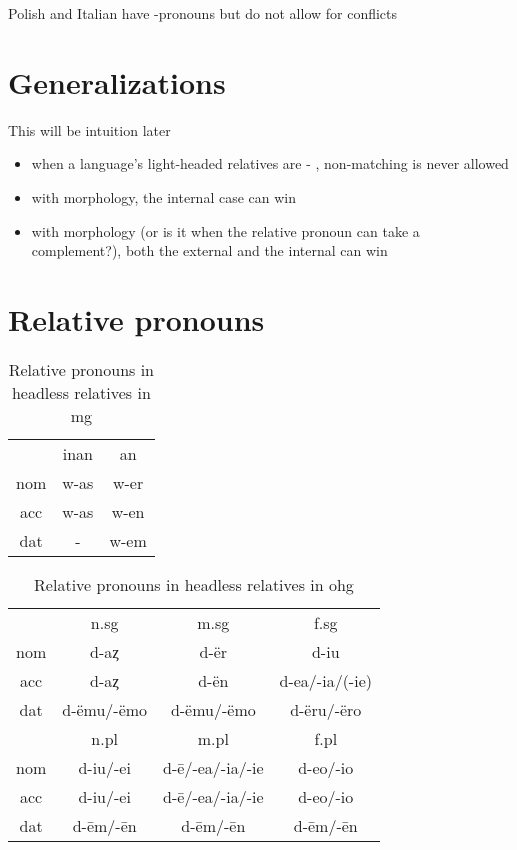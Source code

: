 Polish and Italian have -pronouns but do not allow for conflicts



\section{Generalizations}

This will be intuition later

\begin{itemize}
  \item when a language's light-headed relatives are  - , non-matching is never allowed
  \item with  morphology, the internal case can win
  \item with  morphology (or is it when the relative pronoun can take a complement?), both the external and the internal can win
\end{itemize}


\section{Relative pronouns}


\begin{table}[H]
 \center
 \caption {Relative pronouns in headless relatives in \ac{mg}}
  \begin{tabular}{ccc}
  \toprule
       & \ac{inan} & \ac{an} \\
        \cmidrule{2-3}
    \ac{nom}  & w-as     & w-er    \\
    \ac{acc}  & w-as     & w-en   \\
    \ac{dat}  & -      & w-em    \\
  \bottomrule
  \end{tabular}
\end{table}

\begin{table}[H]\label{tbl:paradigmohg}
 \center
 \caption {Relative pronouns in headless relatives in \ac{ohg}}
  \begin{tabular}{cccc}
  \toprule
       & \ac{n}.\ac{sg} & \ac{m}.\ac{sg}  & \ac{f}.\ac{sg} \\
        \cmidrule{2-4}
  \ac{nom} & d-aȥ           & d-ër          & d-iu      \\
  \ac{acc} & d-aȥ        & d-ën      & d-ea/-ia/(-ie) \\
  \ac{dat} & d-ëmu/-ëmo     & d-ëmu/-ëmo   & d-ëru/-ëro   \\
  \bottomrule
         & \ac{n}.\ac{pl} & \ac{m}.\ac{pl}   & \ac{f}.\ac{pl} \\
          \cmidrule{2-4}
    \ac{nom}  & d-iu/-ei      &  d-ē/-ea/-ia/-ie & d-eo/-io        \\
    \ac{acc}  & d-iu/-ei      &  d-ē/-ea/-ia/-ie & d-eo/-io        \\
    \ac{dat}  & d-ēm/-ēn      &  d-ēm/-ēn        & d-ēm/-ēn        \\
    \bottomrule
  \end{tabular}
\end{table}

